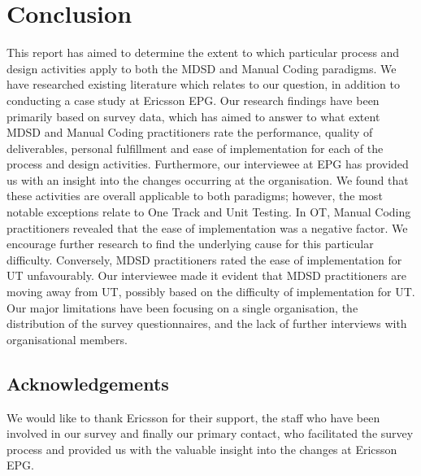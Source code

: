 \documentclass[fina_report_innit.tex]{subfiles}
\begin{document}
\section{Conclusion}
This report has aimed to determine the extent to which particular process and design activities apply to both the MDSD and Manual Coding paradigms. We have researched existing literature which relates to our question, in addition to conducting a case study at Ericsson EPG. Our research findings have been primarily based on survey data, which has aimed to answer to what extent MDSD and Manual Coding practitioners rate the performance, quality of deliverables, personal fulfillment and ease of implementation for each of the process and design activities. Furthermore, our interviewee at EPG has provided us with an insight into the changes occurring at the organisation. We found that these activities are overall applicable to both paradigms; however, the most notable exceptions relate to One Track and Unit Testing. In OT, Manual Coding practitioners revealed that the ease of implementation was a negative factor. We encourage further research to find the underlying cause for this particular difficulty. Conversely, MDSD practitioners rated the ease of implementation for UT unfavourably. Our interviewee made it evident that MDSD practitioners are moving away from UT, possibly based on the difficulty of implementation for UT. Our major limitations have been focusing on a single organisation,  the distribution of the survey questionnaires, and the lack of further interviews with organisational members. 


\subsection*{Acknowledgements}
We would like to thank Ericsson for their support, the staff who have been involved in our survey and finally our primary contact, who facilitated the survey process and provided us with the valuable insight into the changes at Ericsson EPG.
\end{document}
